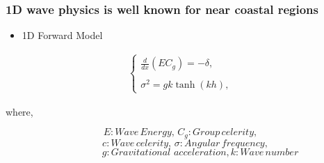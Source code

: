 \documentclass[7pt]{beamer}
\begin{document}
\begin{frame}
 \frametitle{1D wave physics is well known for near coastal regions}
\centering
\begin{itemize}
\item 1D Forward Model
\end{itemize}

\begin{eqnarray*}
\label{fp1}
\left \{
\begin{array}{lll}
\frac{d}{dx}\left(EC_g\right)=-\delta,\\
\\
\sigma^2=gk\tanh(kh),
\label{ode}
\end{array}
\right.
\end{eqnarray*}
\begin{flushleft}
where,
\end{flushleft}
$${E: Wave \,Energy,\, C_{g}: Group \,celerity,}$$
$${\quad c: Wave \,celerity,\, \sigma: Angular \,frequency,}$$
$${\quad\quad\quad\quad g: Gravitational\,\, acceleration,k: Wave \,number}$$
\end{frame}
\end{document}
